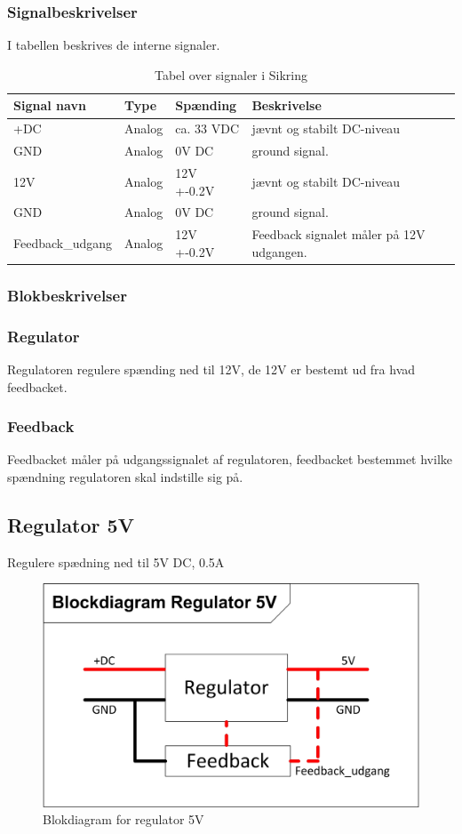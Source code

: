 \subsubsection{Signalbeskrivelser}
I tabellen beskrives de interne signaler.
\begin{table}[H]
\begin{tabular}{|p{3cm}|p{3cm}|p{3cm}|p{4.5cm}|} \hline
\cellcolor[gray]{0.85}Signal navn& \cellcolor[gray]{0.85}Type &\cellcolor[gray]{0.85}Spænding&\cellcolor[gray]{0.85}Beskrivelse\\ \hline
+DC & Analog & ca. 33 VDC & jævnt og stabilt DC-niveau\\  \hline
GND  & Analog & 0V DC & ground signal. \\  \hline
12V & Analog & 12V +-0.2V & jævnt og stabilt DC-niveau\\ \hline
GND & Analog & 0V DC & ground signal.\\ \hline
Feedback\_udgang & Analog & 12V +-0.2V & Feedback signalet måler på 12V udgangen.\\ \hline
\end{tabular}
\caption{Tabel over signaler i Sikring}
\label{table:udglatning}
\end{table}
\subsubsection{Blokbeskrivelser}
\subsubsection{Regulator}
Regulatoren regulere spænding ned til 12V, de 12V er bestemt ud fra hvad feedbacket. 
\subsubsection{Feedback}
Feedbacket måler på udgangssignalet af regulatoren, feedbacket bestemmet hvilke spændning regulatoren skal indstille sig på.
\newpage
\subsection{Regulator 5V}
Regulere spædning ned til 5V DC, 0.5A
\begin{figure}[H]
\centering
\includegraphics[scale=1]{billeder/Regulering_5VBlok}
\caption{Blokdiagram for regulator 5V}
\label{fig:regulator_5V}
\end{figure}
